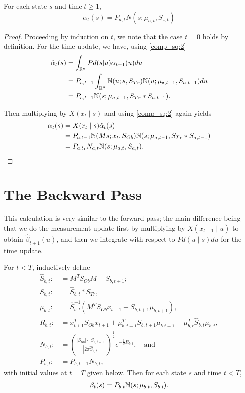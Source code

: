\documentclass[12pt,leqno]{article}
\begin{document}
\begin{Thm}\label{alpha:1}
  For each state $s$ and time $t \ge 1$,
$$
  \alpha_t(s) = P_{a,t}N(s;\mu_{a,t},S_{a,t})
$$
\end{Thm}

\begin{proof}

Proceeding by induction on $t$, we note that the case $t = 0$ holds by definition.
For the time update, we have, using \eqref{comp_sq:2}
\begin{align}
  \hat{\alpha}_t(s) &= \int_{{\mathbb R}^n}Pd(s|u)\alpha_{t-1}(u)du \\\notag
  &= P_{a,t-1}\int_{{\mathbb R}^n}{\mathbb N}(u;s,S_{Tr}){\mathbb N}(u;\mu_{a,t-1},S_{a,t-1})du \notag\\
  &= P_{a,t-1}{\mathbb N}(s;\mu_{a,t-1},S_{Tr}*S_{a,t-1}).
\end{align}

Then multiplying by $X(x_t\mid s)$ and using \eqref{comp_sq:2} again yields
\begin{align*}
  \alpha_t(s) &= X(x_t\mid s)\hat{\alpha}_t(s) \\
  &= P_{a,t-1}{\mathbb N}(Ms;x_t,S_{Ob}){\mathbb N}(s;\mu_{a,t-1},S_{Tr}*S_{a,t-1}) \\
  &= P_{a,t_1}N_{a,t}{\mathbb N}(s;\mu_{a,t},S_{a,t}).
\end{align*}
\end{proof}

\section{The Backward Pass}
This calculation is very similar to the forward pass; the main difference being that we do
the measurement update first by multiplying by $X(x_{t+1}\mid u)$ to obtain $\hat{\beta}_{t+1}(u)$,
and then we integrate with respect to $Pd(u\mid s)du$ for the time update.  

\begin{Thm}\label{beta:1}
  For $t < T$, inductively define
\begin{align*}
  \hat{S}_{b,t} :&= M^TS_{Ob}M + S_{b,t+1};\\
  S_{b,t} :&= \hat{S}_{b,t}*S_{Tr},\\
  \mu_{b,t} :&= \hat{S}_{b,t}^{-1}(M^TS_{Ob}x_{t+1} + S_{b,t+1}\mu_{b,t+1}),\\
  R_{b,t} :&= x_{t+1}^TS_{Ob}x_{t+1} + \mu_{b,t+1}^TS_{b,t+1}\mu_{b,t+1} - \mu_{b,t}^T\hat{S}_{b,t}\mu_{b,t},\\
  N_{b,t} :&= \left(\frac{|S_{Ob}|\cdot|S_{b,t+1}|}{|2\pi\hat{S}_{b,t}|}\right)^{\frac{1}{2}}e^{-\frac{1}{2}R_{b,t}},\quad\text{and}\\
  P_{b,t}:&=P_{b,t+1}N_{b,t},
\end{align*}
with initial values at $t = T$ given below. Then for each state $s$ and time $t < T$,
$$
  \beta_t(s) = P_{b,t}{\mathbb N}(s;\mu_{b,t},S_{b,t}).
$$
\end{Thm}
\end{document}
